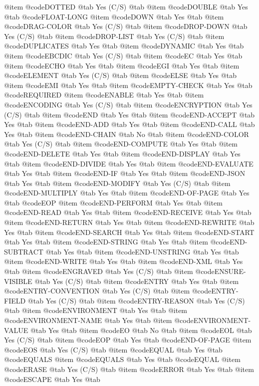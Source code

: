 @item @code{DOTTED} @tab Yes	(C/S) @tab 
@item @code{DOUBLE} @tab Yes @tab @code{FLOAT-LONG}
@item @code{DOWN} @tab Yes @tab 
@item @code{DRAG-COLOR} @tab Yes	(C/S) @tab 
@item @code{DROP-DOWN} @tab Yes	(C/S) @tab 
@item @code{DROP-LIST} @tab Yes	(C/S) @tab 
@item @code{DUPLICATES} @tab Yes @tab 
@item @code{DYNAMIC} @tab Yes @tab 
@item @code{EBCDIC} @tab Yes	(C/S) @tab 
@item @code{EC} @tab Yes @tab 
@item @code{ECHO} @tab Yes @tab 
@item @code{EGI} @tab Yes @tab 
@item @code{ELEMENT} @tab Yes	(C/S) @tab 
@item @code{ELSE} @tab Yes @tab 
@item @code{EMI} @tab Yes @tab 
@item @code{EMPTY-CHECK} @tab Yes @tab @code{REQUIRED}
@item @code{ENABLE} @tab Yes @tab 
@item @code{ENCODING} @tab Yes	(C/S) @tab 
@item @code{ENCRYPTION} @tab Yes	(C/S) @tab 
@item @code{END} @tab Yes @tab 
@item @code{END-ACCEPT} @tab Yes @tab 
@item @code{END-ADD} @tab Yes @tab 
@item @code{END-CALL} @tab Yes @tab 
@item @code{END-CHAIN} @tab No @tab 
@item @code{END-COLOR} @tab Yes	(C/S) @tab 
@item @code{END-COMPUTE} @tab Yes @tab 
@item @code{END-DELETE} @tab Yes @tab 
@item @code{END-DISPLAY} @tab Yes @tab 
@item @code{END-DIVIDE} @tab Yes @tab 
@item @code{END-EVALUATE} @tab Yes @tab 
@item @code{END-IF} @tab Yes @tab 
@item @code{END-JSON} @tab Yes @tab 
@item @code{END-MODIFY} @tab Yes	(C/S) @tab 
@item @code{END-MULTIPLY} @tab Yes @tab 
@item @code{END-OF-PAGE} @tab Yes @tab @code{EOP}
@item @code{END-PERFORM} @tab Yes @tab 
@item @code{END-READ} @tab Yes @tab 
@item @code{END-RECEIVE} @tab Yes @tab 
@item @code{END-RETURN} @tab Yes @tab 
@item @code{END-REWRITE} @tab Yes @tab 
@item @code{END-SEARCH} @tab Yes @tab 
@item @code{END-START} @tab Yes @tab 
@item @code{END-STRING} @tab Yes @tab 
@item @code{END-SUBTRACT} @tab Yes @tab 
@item @code{END-UNSTRING} @tab Yes @tab 
@item @code{END-WRITE} @tab Yes @tab 
@item @code{END-XML} @tab Yes @tab 
@item @code{ENGRAVED} @tab Yes	(C/S) @tab 
@item @code{ENSURE-VISIBLE} @tab Yes	(C/S) @tab 
@item @code{ENTRY} @tab Yes @tab 
@item @code{ENTRY-CONVENTION} @tab Yes	(C/S) @tab 
@item @code{ENTRY-FIELD} @tab Yes	(C/S) @tab 
@item @code{ENTRY-REASON} @tab Yes	(C/S) @tab 
@item @code{ENVIRONMENT} @tab Yes @tab 
@item @code{ENVIRONMENT-NAME} @tab Yes @tab 
@item @code{ENVIRONMENT-VALUE} @tab Yes @tab 
@item @code{EO} @tab No @tab 
@item @code{EOL} @tab Yes	(C/S) @tab 
@item @code{EOP} @tab Yes @tab @code{END-OF-PAGE}
@item @code{EOS} @tab Yes	(C/S) @tab 
@item @code{EQUAL} @tab Yes @tab @code{EQUALS}
@item @code{EQUALS} @tab Yes @tab @code{EQUAL}
@item @code{ERASE} @tab Yes	(C/S) @tab 
@item @code{ERROR} @tab Yes @tab 
@item @code{ESCAPE} @tab Yes @tab 
